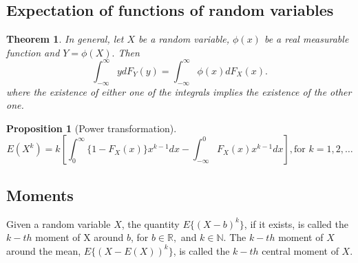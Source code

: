 \documentclass[12pt]{report} \addtolength{\textheight}{2in}
\newtheorem{prop}{Proposition}
\newtheorem{thm}{Theorem}
\newcommand{\totalint}{\int_{-\infty}^{\infty}}
\newcommand{\Realnum}{\mathbb{R}}
\newcommand{\bigN}{\mathbb{N}}
\begin{document}
 \subsection*{Expectation of functions of random variables}
 \begin{thm}
 In general, let $X$ be a random variable, $\phi(x)$ be a real measurable function and $Y=\phi(X).$ Then
 \begin{displaymath}
 \totalint y dF_Y(y)=\totalint \phi(x) dF_X(x).
 \end{displaymath}
 where the existence of either one of the integrals implies the existence of the other one.	
 \end{thm}
 \begin{prop}[Power transformation]
 \begin{displaymath}
 E(X^k) = k [\int_{0}^{\infty} \{1- F_X(x)\} x^{k-1}dx - \int_{-\infty}^{0} F_X(x) x^{k-1}dx], \text{for $k=1,2,\dots$}
 \end{displaymath}
 \end{prop}
 \newpage
 \subsection*{Moments}
Given a random variable $X$, the quantity $E\{(X-b)^k\}$, if it exists, is called the $k-th$ moment of X around $b$, for $b \in \Realnum,$ and $k\in \bigN.$ The $k-th$ moment of $X$ around the mean, $E\{(X-E(X))^k\}$, is called the $k-th$ central moment of $X.$
\end{document}
